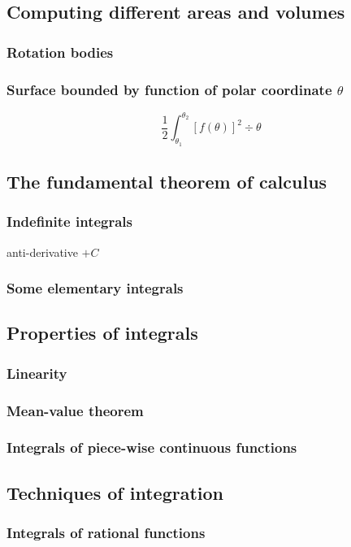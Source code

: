 \subsection{Computing different areas and volumes}
\subsubsection{Rotation bodies}
\subsubsection{Surface bounded by function of polar coordinate $\theta$}
\[ \frac{1}{2}\int_{\theta_1}^{\theta_2}[f(\theta)]^2\div{\theta} \]

\subsection{The fundamental theorem of calculus}
\subsubsection{Indefinite integrals}
anti-derivative $+C$
\subsubsection{Some elementary integrals}

\subsection{Properties of integrals}
\subsubsection{Linearity}
\subsubsection{Mean-value theorem}
\subsubsection{Integrals of piece-wise continuous functions}

\subsection{Techniques of integration}
\subsubsection{Integrals of rational functions}
